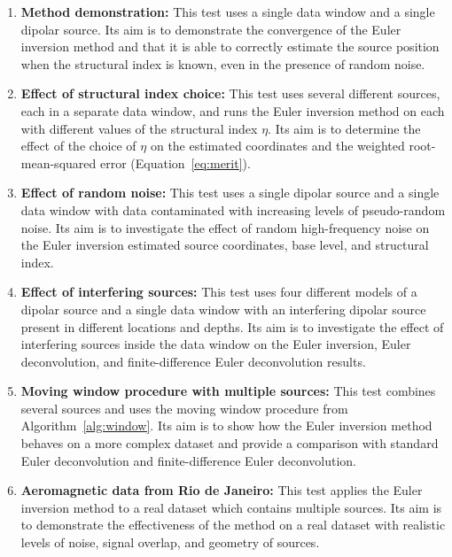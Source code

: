 \begin{enumerate}
    \item \textbf{Method demonstration:} This test uses a single data window
        and a single dipolar source. Its aim is to demonstrate the convergence
        of the Euler inversion method and that it is able to correctly estimate
        the source position when the structural index is known, even in the
        presence of random noise.
    \item \textbf{Effect of structural index choice:} This test uses several
        different sources, each in a separate data window, and runs the Euler
        inversion method on each with different values of the structural index
        $\eta$. Its aim is to determine the effect of the choice of $\eta$ on
        the estimated coordinates and the weighted root-mean-squared error
        (Equation~\ref{eq:merit}).
    \item \textbf{Effect of random noise:} This test uses a single dipolar
        source and a single data window with data contaminated with increasing
        levels of pseudo-random noise. Its aim is to investigate the effect of
        random high-frequency noise on the Euler inversion estimated source
        coordinates, base level, and structural index.
    \item \textbf{Effect of interfering sources:} This test uses four different
        models of a dipolar source and a single data window with an interfering
        dipolar source present in different locations and depths. Its aim is to
        investigate the effect of interfering sources inside the data window on
        the Euler inversion, Euler deconvolution, and finite-difference Euler
        deconvolution results.
    \item \textbf{Moving window procedure with multiple sources:} This test
        combines several sources and uses the moving window procedure from
        Algorithm~\ref{alg:window}. Its aim is to show how the Euler inversion
        method behaves on a more complex dataset and provide a comparison with
        standard Euler deconvolution and finite-difference Euler deconvolution.
    \item \textbf{Aeromagnetic data from Rio de Janeiro:} This test applies
        the Euler inversion method to a real dataset which contains multiple
        sources. Its aim is to demonstrate the effectiveness of the method
        on a real dataset with realistic levels of noise, signal overlap,
        and geometry of sources.
\end{enumerate}

